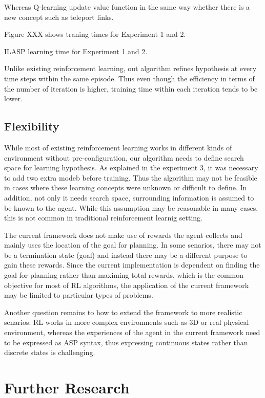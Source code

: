 Whereas Q-learning update value function in the same way whether there is a new concept such as teleport links.

Figure XXX shows traning times for Experiment 1 and 2.

ILASP learning time for Experiment 1 and 2. 

Unlike existing reinforcement learning,
out algorithm refines hypothesis at every time steps within the same episode.
Thus even though the efficiency in terms of the number of iteration is higher,
training time within each iteration tends to be lower.

\subsection{Flexibility}
While most of existing reinforcement learning works in different kinds of environment without pre-configuration, our algorithm
needs to define search space for learning hypothesis. As explained in the experiment 3, it was necessary to add two extra modeb before training.
Thus the algorithm may not be feasible in cases where these learning concepts were unknown or difficult to define. 
In addition, not only it needs search space, surrounding information is assumed to be known to the agent. 
While this assumption may be reasonable in many cases, this is not common in traditional reinforcement learnig setting.

The current framework does not make use of rewards the agent collects and mainly uses the location of the goal for planning.
In some senarios, there may not be a termination state (goal) and instead there may be a different purpose to gain these rewards. 
Since the current implementation is dependent on finding the goal for planning rather than maximing total rewards, which is the common objective for most of RL algorithms,
the application of the current framework may be limited to particular types of problems.

Another question remains to how to extend the framework to more realistic senarios. RL works in more complex environments such as 3D or real physical environment, 
whereas the experiences of the agent in the current framework need to be expressed as ASP syntax, thus expressing continuous states rather than discrete states is challenging.

\section{Further Research}
\label{further_research}

